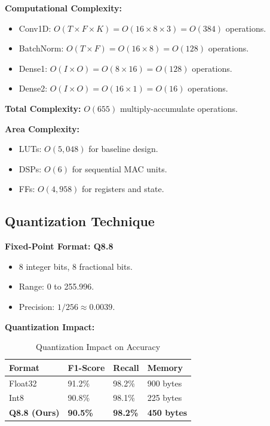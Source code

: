 \documentclass[11pt, a4paper]{article}
\begin{document}
\textbf{Computational Complexity:}
\begin{itemize}
    \item Conv1D: $O(T \times F \times K) = O(16 \times 8 \times 3) = O(384)$ operations.
    \item BatchNorm: $O(T \times F) = O(16 \times 8) = O(128)$ operations.
    \item Dense1: $O(I \times O) = O(8 \times 16) = O(128)$ operations.
    \item Dense2: $O(I \times O) = O(16 \times 1) = O(16)$ operations.
\end{itemize}

\textbf{Total Complexity:} $O(655)$ multiply-accumulate operations.

\textbf{Area Complexity:}
\begin{itemize}
    \item LUTs: $O(5,048)$ for baseline design.
    \item DSPs: $O(6)$ for sequential MAC units.
    \item FFs: $O(4,958)$ for registers and state.
\end{itemize}

\subsection{Quantization Technique}

\textbf{Fixed-Point Format: Q8.8}
\begin{itemize}
    \item 8 integer bits, 8 fractional bits.
    \item Range: 0 to 255.996.
    \item Precision: $1/256 \approx 0.0039$.
\end{itemize}

\textbf{Quantization Impact:}
\begin{table}[H]
\centering
\caption{Quantization Impact on Accuracy}
\label{tab:quant}
\begin{tabular}{@{}llll@{}}
\toprule
\textbf{Format} & \textbf{F1-Score} & \textbf{Recall} & \textbf{Memory} \\ \midrule
Float32 & 91.2\% & 98.2\% & 900 bytes \\
Int8 & 90.8\% & 98.1\% & 225 bytes \\
\textbf{Q8.8 (Ours)} & \textbf{90.5\%} & \textbf{98.2\%} & \textbf{450 bytes} \\ \bottomrule
\end{tabular}
\end{table}
\end{document}
